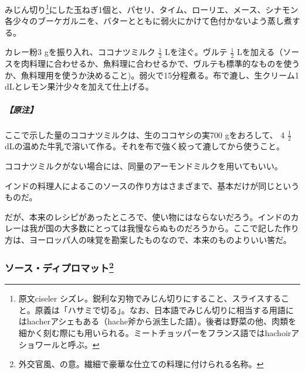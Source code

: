 \begin{recette}

みじん切り\footnote{原文ciseler
  シズレ。鋭利な刃物でみじん切りにすること、スライスすること。原義は「ハサミで切る」。なお、日本語でみじん切りに相当する用語にはhacherアシェもある（hache斧から派生した語）。後者は野菜の他、肉類を細かく刻む際にも用いられる。ミートチョッパーをフランス語ではhachoirアショワールと呼ぶ。}にした玉ねぎ1個と、パセリ、タイム、ローリエ、メース、シナモン各少々のブーケガルニを、バターとともに弱火にかけて色付かないよう蒸し煮する。

カレー粉3 gを振り入れ、ココナツミルク \(\frac{1}{2}\) Lを注ぐ。ヴルテ
\(\frac{1}{2}\)
Lを加える（ソースを肉料理に合わせるか、魚料理に合わせるかで、ヴルテも標準的なものを使うか、魚料理用を使うか決めること)。弱火で15分程煮る。布で漉し、生クリーム1
dLとレモン果汁少々を加えて仕上げる。

\hypertarget{nota-sauce-currie-indienne}{%
\subparagraph{【原注】}\label{nota-sauce-currie-indienne}}

ここで示した量のココナツミルクは、生のココヤシの実700 gをおろして、 4
\(\frac{1}{2}\)
dLの温めた牛乳で溶いて作る。それを布で強く絞って漉してから使うこと。

ココナツミルクがない場合には、同量のアーモンドミルクを用いてもいい。

インドの料理人によるこのソースの作り方はさまざまで、基本だけが同じというものだ。

だが、本来のレシピがあったところで、使い物にはならないだろう。インドのカレーは我が国の大多数にとっては我慢ならぬものだろうから。ここで記した作り方は、ヨーロッパ人の味覚を勘案したものなので、本来のものよりいい筈だ。

\hypertarget{sauce-diplomate}{%
\subsubsection[ソース・ディプロマット]{\texorpdfstring{ソース・ディプロマット\footnote{外交官風、の意。繊細で豪華な仕立ての料理に付けられる名称。}}{ソース・ディプロマット}}\label{sauce-diplomate}}



\end{recette}
